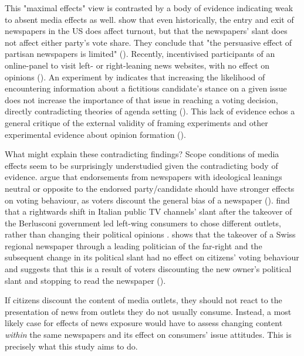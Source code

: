 \documentclass{article}
\begin{document}
This "maximal effects" view is contrasted by a body of evidence indicating weak to absent media effects as well. \citeauthor{Gentzkow2011} show that even historically, the entry and exit of newspapers in the US does affect turnout, but that the newspapers' slant does not affect either party's vote share. They conclude that "the persuasive effect of partisan newspapers is limited" (\citeyear[3011]{Gentzkow2011}). Recently, \citeauthor{Guess2021} incentivised participants of an online-panel to visit left- or right-leaning news websites, with no effect on opinions (\citeyear{Guess2021}). An experiment by \citeauthor{Lau2021} indicates that increasing the likelihood of encountering information about a fictitious candidate's stance on a given issue does not increase the importance of that issue in reaching a voting decision, directly contradicting theories of agenda setting (\citeyear{Lau2021}). This lack of evidence echos a general critique of the external validity of framing experiments and other experimental evidence about opinion formation (\cite{Barabas2010, Busby2019, Leeper2020}).

What might explain these contradicting findings? Scope conditions of media effects seem to be surprisingly understudied given the contradicting body of evidence. \citeauthor{Chiang2011a} argue that endorsements from newspapers with ideological leanings neutral or opposite to the endorsed party/candidate should have stronger effects on voting behaviour, as voters discount the general bias of a newspaper (\citeyear{Chiang2011a}). \citeauthor{Durante2012} find that a rightwards shift in Italian public TV channels' slant after the takeover of the Berlusconi government led left-wing consumers to chose different outlets, rather than changing their political opinions  \citeyear{Durante2012}. \citeauthor{Spirig2020} shows that the takeover of a Swiss regional newspaper through a leading politician of the far-right and the subsequent change in its political slant had no effect on citizens' voting behaviour and suggests that this is a result of voters discounting the new owner's political slant and stopping to read the newspaper (\citeyear{Spirig2020}).

If citizens discount the content of media outlets, they should not react to the presentation of news from outlets they do not usually consume. Instead, a most likely case for effects of news exposure would have to assess changing content \textit{within} the same newspapers and its effect on consumers' issue attitudes. This is precisely what this study aims to do.
\end{document}
